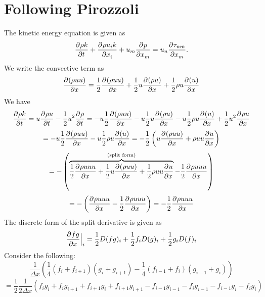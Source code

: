 \documentclass[12pt]{article}
\numberwithin{equation}{section}
\numberwithin{figure}{section}
\begin{document}
\section{Following Pirozzoli}
The kinetic energy equation is given as 
\begin{equation}
\frac{\partial^{} \rho k}{\partial t^{}} + \frac{\partial^{} \rho u_i k}{\partial x_i^{}} + u_m\frac{\partial^{} p}{\partial x_m^{}} = u_n\frac{\partial^{} \tau_{nm}}{\partial x_m^{}}.
\end{equation}
We write the convective term as
\begin{equation}
\frac{\partial^{} (\rho u u)}{\partial x^{}} = \frac{1}{2}\frac{\partial^{} (\rho u u)}{\partial x^{}} + \frac{1}{2}u\frac{\partial^{} (\rho u)}{\partial x^{}} + \frac{1}{2}\rho u\frac{\partial^{} (u)}{\partial x^{}}
\end{equation}
We have 
\begin{equation}
\frac{\partial^{} \rho k}{\partial t^{}} = u\frac{\partial^{} \rho u}{\partial t^{}} - \frac{1}{2}u^2\frac{\partial^{} \rho}{\partial t^{}} = -u\frac{1}{2}\frac{\partial^{} (\rho u u)}{\partial x^{}} - u\frac{1}{2}u\frac{\partial^{} (\rho u)}{\partial x^{}} - u\frac{1}{2}\rho u\frac{\partial^{} (u)}{\partial x^{}} + \frac{1}{2}u^2\frac{\partial^{} \rho u}{\partial x^{}}
\end{equation}
\begin{equation}
= -u\frac{1}{2}\frac{\partial^{} (\rho u u)}{\partial x^{}} - u\frac{1}{2}\rho u\frac{\partial^{} (u)}{\partial x^{}} = -\frac{1}{2}\left(u\frac{\partial^{} (\rho uu)}{\partial x^{}} + \rho uu\frac{\partial^{} u}{\partial x^{}}\right)
\end{equation}
\begin{equation}
= -\left(\overbrace{\frac{1}{2}\frac{\partial^{} \rho u uu}{\partial x^{}} + \frac{1}{2} u\frac{\partial^{} (\rho uu)}{\partial x^{}} + \frac{1}{2} \rho uu\frac{\partial^{} u}{\partial x^{}}}^{\textrm{(split form)}} - \frac{1}{2}\frac{\partial^{} \rho u uu}{\partial x^{}}\right)
\end{equation}
\begin{equation}
= -\left(\frac{\partial^{} \rho u uu}{\partial x^{}} - \frac{1}{2}\frac{\partial^{} \rho u uu}{\partial x^{}}\right) = -\frac{1}{2}\frac{\partial^{} \rho uuu}{\partial x^{}}
\end{equation}
The discrete form of the split derivative is given as
\begin{equation}
\frac{\partial^{} fg}{\partial x^{}}\Big|_i = \frac{1}{2}D(fg)_i + \frac{1}{2}f_iD(g)_i + \frac{1}{2}g_iD(f)_i
\end{equation}
Consider the following:
\begin{equation}\label{eq::conserv1}
\frac{1}{\Delta x}\left(\frac{1}{4}\left(f_i + f_{i+1}\right)\left(g_i + g_{i+1}\right) - \frac{1}{4}\left(f_{i-1} + f_{i}\right)\left(g_{i-1} + g_{i}\right)\right)
\end{equation}
\begin{equation}
=\frac{1}{2}\frac{1}{2\Delta x}\left(f_{i}g_{i} + f_{i}g_{i+1} + f_{i+1}g_{i} + f_{i+1}g_{i+1} - f_{i-1}g_{i-1} - f_{i}g_{i-1} - f_{i-1}g_{i} - f_{i}g_{i}\right)
\end{equation}
\end{document}
